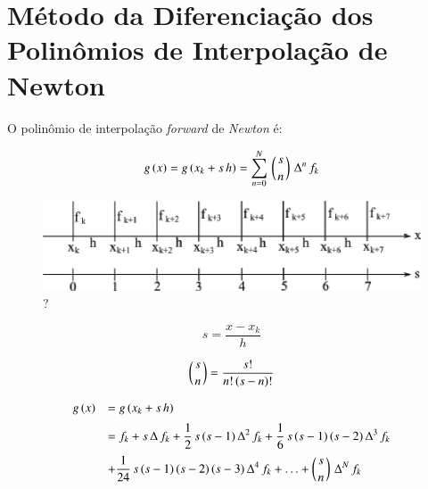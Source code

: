 \section{Método da Diferenciação dos Polinômios de Interpolação de Newton}

\begin{enumerar}

\item O polinômio de interpolação \textit{forward} de \textit{Newton} é:

\begin{equation}
 \label{cap3:sec3:eq1}
 g\,(x) = g\,(x_k + s\,h) = \sum_{n=0}^N \, \left(s \atop n\right) \, \Delta^n \, f_k
\end{equation}

\begin{figure}[htb]
 \centering
 \includegraphics[scale=1.0]{capitulos/capitulo3/figuras/met_dif_pol_int_new1.eps}
 \caption{?}
 \label{fig:met_dif_pol_int_new1}
\end{figure}

\begin{equation}
 \label{cap3:sec3:eq2}
 s = \frac{x - x_k}{h}
\end{equation}

\begin{equation}
 \label{cap3:sec3:eq3}
 \left(s \atop n\right) = \frac{s!}{n!\,(s-n)!}
\end{equation}

\begin{equation}
 \label{cap3:sec3:eq4}
 \begin{array}{ll}
  g\,(x) & = g\,(x_k + s\,h) \vspace*{0.2cm} \\
         & = f_k + s\,\Delta\,f_k + \displaystyle \frac{1}{2} \, s\,(s-1)\,\Delta^2\,f_k + \frac{1}{6} \, s\,(s-1)\,(s-2)\,\Delta^3\,f_k \vspace*{0.2cm} \\
         & + \displaystyle \frac{1}{24}\,s\,(s-1)\,(s-2)\,(s-3)\,\Delta^4\,f_k + \ldots + \left(s \atop n\right) \, \Delta^N \, f_k
 \end{array}
\end{equation}


\end{enumerar}
